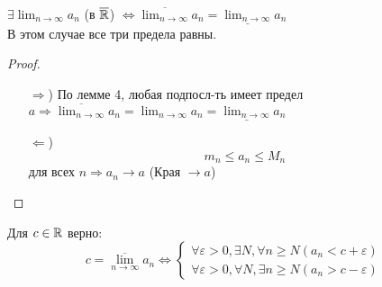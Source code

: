 \begin{consequence}
$\exists \lim_{n\to\infty}a_n$ (в $\overline{\mathbb{R}}$) $\iff \overline{\lim_{n\to\infty}}a_n = \underline{\lim_{n\to\infty}} a_n$ \\
В этом случае все три предела равны.
\end{consequence}
\begin{proof}
  \begin{itemize}
    \item [$\Rightarrow$)]
По лемме 4, любая подпосл-ть имеет предел $a \Rightarrow \overline{\lim_{n\to\infty}}a_n = \lim_{n\to\infty}a_n = \underline{\lim_{n\to\infty}}a_n$ 
    \item [$\Leftarrow$)] \[
    m_n \leq a_n \leq M_n
    \]
    для всех $n \Rightarrow a_n \rightarrow a$ (Края $\rightarrow a$)
  \end{itemize}
\end{proof}
\begin{lemma}
Для $c \in \mathbb{R}$ верно:
\begin{equation*}
c = \overline{\lim_{n\to\infty}}a_n \iff 
\begin{cases}
\forall \varepsilon > 0, \exists N, \forall n \geq N (a_n < c + \varepsilon) \\
\forall \varepsilon > 0, \forall N, \exists n \geq N (a_n > c-\varepsilon)
\end{cases}
\end{equation*}
\end{lemma}
